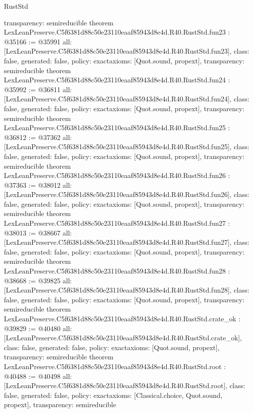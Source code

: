 \begin{lexlean}{RustStd}
\begin{coremodule}
{  transparency: semireducible
}
theorem LexLeanPreserve.C5f6381d88c50e23110eaaf85943d8e4d.R40.RustStd.fun23 : @35166 := @35991 {
  all: [LexLeanPreserve.C5f6381d88c50e23110eaaf85943d8e4d.R40.RustStd.fun23],
  class: false,
  generated: false,
  policy: exact{axioms: [Quot.sound, propext]},
  transparency: semireducible
}
theorem LexLeanPreserve.C5f6381d88c50e23110eaaf85943d8e4d.R40.RustStd.fun24 : @35992 := @36811 {
  all: [LexLeanPreserve.C5f6381d88c50e23110eaaf85943d8e4d.R40.RustStd.fun24],
  class: false,
  generated: false,
  policy: exact{axioms: [Quot.sound, propext]},
  transparency: semireducible
}
theorem LexLeanPreserve.C5f6381d88c50e23110eaaf85943d8e4d.R40.RustStd.fun25 : @36812 := @37362 {
  all: [LexLeanPreserve.C5f6381d88c50e23110eaaf85943d8e4d.R40.RustStd.fun25],
  class: false,
  generated: false,
  policy: exact{axioms: [Quot.sound, propext]},
  transparency: semireducible
}
theorem LexLeanPreserve.C5f6381d88c50e23110eaaf85943d8e4d.R40.RustStd.fun26 : @37363 := @38012 {
  all: [LexLeanPreserve.C5f6381d88c50e23110eaaf85943d8e4d.R40.RustStd.fun26],
  class: false,
  generated: false,
  policy: exact{axioms: [Quot.sound, propext]},
  transparency: semireducible
}
theorem LexLeanPreserve.C5f6381d88c50e23110eaaf85943d8e4d.R40.RustStd.fun27 : @38013 := @38667 {
  all: [LexLeanPreserve.C5f6381d88c50e23110eaaf85943d8e4d.R40.RustStd.fun27],
  class: false,
  generated: false,
  policy: exact{axioms: [Quot.sound, propext]},
  transparency: semireducible
}
theorem LexLeanPreserve.C5f6381d88c50e23110eaaf85943d8e4d.R40.RustStd.fun28 : @38668 := @39825 {
  all: [LexLeanPreserve.C5f6381d88c50e23110eaaf85943d8e4d.R40.RustStd.fun28],
  class: false,
  generated: false,
  policy: exact{axioms: [Quot.sound, propext]},
  transparency: semireducible
}
theorem LexLeanPreserve.C5f6381d88c50e23110eaaf85943d8e4d.R40.RustStd.crate_ok : @39829 := @40480 {
  all: [LexLeanPreserve.C5f6381d88c50e23110eaaf85943d8e4d.R40.RustStd.crate_ok],
  class: false,
  generated: false,
  policy: exact{axioms: [Quot.sound, propext]},
  transparency: semireducible
}
theorem LexLeanPreserve.C5f6381d88c50e23110eaaf85943d8e4d.R40.RustStd.root : @40488 := @40498 {
  all: [LexLeanPreserve.C5f6381d88c50e23110eaaf85943d8e4d.R40.RustStd.root],
  class: false,
  generated: false,
  policy: exact{axioms: [Classical.choice, Quot.sound, propext]},
  transparency: semireducible
}


\end{coremodule}
\end{lexlean}
